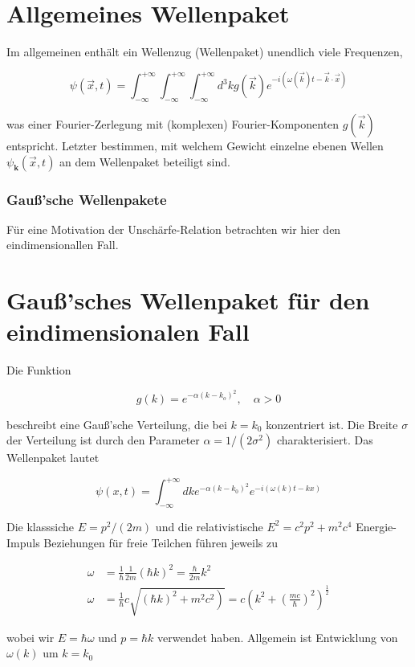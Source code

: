 \documentclass[10pt, letterpaper]{article}
\begin{document}
\section*{Allgemeines Wellenpaket}
Im allgemeinen enthält ein Wellenzug (Wellenpaket) unendlich viele Frequenzen,

$$
\psi(\vec{x}, t)=\int_{-\infty}^{+\infty} \int_{-\infty}^{+\infty} \int_{-\infty}^{+\infty} d^{3} k g(\vec{k}) e^{-i(\omega(\vec{k}) t-\vec{k} \cdot \vec{x})}
$$

was einer Fourier-Zerlegung mit (komplexen) Fourier-Komponenten $g(\vec{k})$ entspricht. Letzter bestimmen, mit welchem Gewicht einzelne ebenen Wellen $\psi_{\mathbf{k}}(\vec{x}, t)$ an dem Wellenpaket beteiligt sind.

\subsubsection*{Gauß'sche Wellenpakete}
Für eine Motivation der Unschärfe-Relation betrachten wir hier den eindimensionallen Fall.

\section*{Gauß'sches Wellenpaket für den eindimensionalen Fall}
Die Funktion

$$
g(k)=e^{-\alpha\left(k-k_{o}\right)^{2}}, \quad \alpha>0
$$

beschreibt eine Gauß'sche Verteilung, die bei $k=k_{0}$ konzentriert ist. Die Breite $\sigma$ der Verteilung ist durch den Parameter $\alpha=1 /\left(2 \sigma^{2}\right)$ charakterisiert. Das Wellenpaket lautet

$$
\psi(x, t)=\int_{-\infty}^{+\infty} d k e^{-\alpha\left(k-k_{0}\right)^{2}} e^{-i(\omega(k) t-k x)}
$$

Die klasssiche $E=p^{2} /(2 m)$ und die relativistische $E^{2}=c^{2} p^{2}+m^{2} c^{4}$ Energie-Impuls Beziehungen für freie Teilchen führen jeweils zu

$$
\begin{aligned}
\omega & =\frac{1}{\hbar} \frac{1}{2 m}(\hbar k)^{2}=\frac{\hbar}{2 m} k^{2} \\
\omega & =\frac{1}{\hbar} c \sqrt{\left.(\hbar k)^{2}+m^{2} c^{2}\right)}=c\left(k^{2}+\left(\frac{m c}{\hbar}\right)^{2}\right)^{\frac{1}{2}}
\end{aligned}
$$

wobei wir $E=\hbar \omega$ und $p=\hbar k$ verwendet haben. Allgemein ist Entwicklung von $\omega(k)$ um $k=k_{0}$
\end{document}
